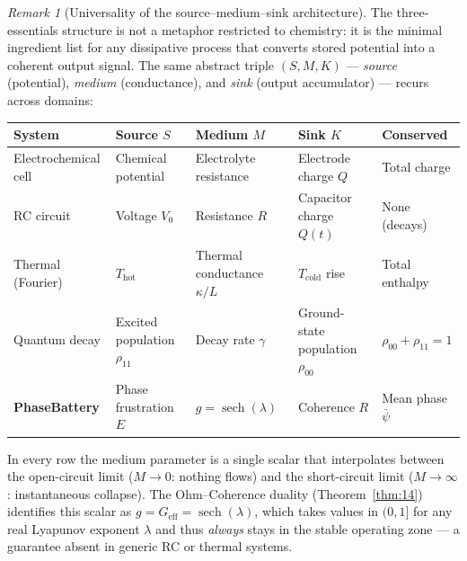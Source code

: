 \documentclass[12pt,a4paper]{article}
\theoremstyle{plain}
\theoremstyle{definition}
\theoremstyle{remark}
\newtheorem{remark}[theorem]{Remark}
\newcommand{\Geff}{G_{\mathrm{eff}}}
\begin{document}
\begin{remark}[Universality of the source--medium--sink architecture]
  \label{rem:sms-universal}
  The three-essentials structure is not a metaphor restricted to chemistry: it
  is the minimal ingredient list for any dissipative process that converts
  stored potential into a coherent output signal.  The same abstract triple
  $(S, M, K)$ — \emph{source} (potential), \emph{medium} (conductance), and
  \emph{sink} (output accumulator) — recurs across domains:

  \begin{center}
  \renewcommand{\arraystretch}{1.2}
  \begin{tabular}{@{}lllll@{}}
  \toprule
  System & Source $S$ & Medium $M$ & Sink $K$ & Conserved\\
  \midrule
  Electrochemical cell
    & Chemical potential
    & Electrolyte resistance
    & Electrode charge $Q$
    & Total charge\\
  RC circuit
    & Voltage $V_0$
    & Resistance $R$
    & Capacitor charge $Q(t)$
    & None (decays)\\
  Thermal (Fourier)
    & $T_{\mathrm{hot}}$
    & Thermal conductance $\kappa/L$
    & $T_{\mathrm{cold}}$ rise
    & Total enthalpy\\
  Quantum decay
    & Excited population $\rho_{11}$
    & Decay rate $\gamma$
    & Ground-state population $\rho_{00}$
    & $\rho_{00}+\rho_{11}=1$\\
  \textbf{PhaseBattery}
    & Phase frustration $E$
    & $g = \operatorname{sech}(\lambda)$
    & Coherence $R$
    & Mean phase $\bar\psi$\\
  \bottomrule
  \end{tabular}
  \end{center}

  In every row the medium parameter is a single scalar that interpolates
  between the open-circuit limit ($M\to 0$: nothing flows) and the
  short-circuit limit ($M\to\infty$: instantaneous collapse).  The
  Ohm--Coherence duality (Theorem~\ref{thm:14}) identifies this scalar as
  $g = \Geff = \operatorname{sech}(\lambda)$, which takes values in $(0,1]$
  for any real Lyapunov exponent $\lambda$ and thus \emph{always} stays in the
  stable operating zone — a guarantee absent in generic RC or thermal systems.


\end{remark}
\end{document}
